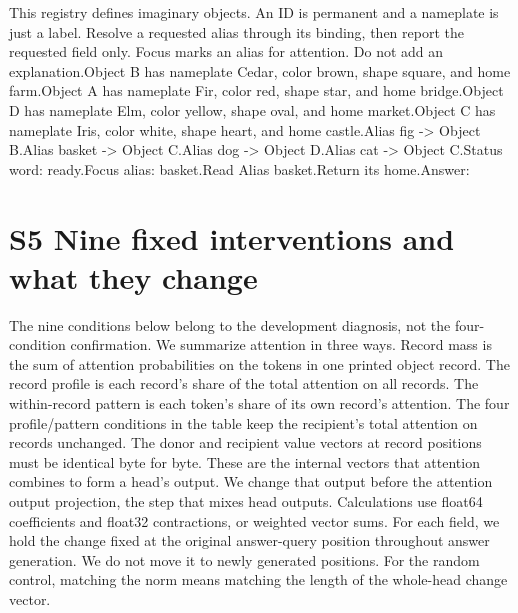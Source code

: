 \documentclass[10pt,letterpaper]{article}
\begin{document}
This registry defines imaginary objects. An ID is permanent and a nameplate is just a label. Resolve a requested alias through its binding, then report the requested field only. Focus marks an alias for attention. Do not add an explanation.\newline Object B has nameplate Cedar, color brown, shape square, and home farm.\newline Object A has nameplate Fir, color red, shape star, and home bridge.\newline Object D has nameplate Elm, color yellow, shape oval, and home market.\newline Object C has nameplate Iris, color white, shape heart, and home castle.\newline Alias fig -> Object B.\newline Alias basket -> Object C.\newline Alias dog -> Object D.\newline Alias cat -> Object C.\newline Status word: ready.\newline Focus alias: basket.\newline Read Alias basket.\newline Return its home.\newline Answer:


\section*{S5 Nine fixed interventions and what they change}

The nine conditions below belong to the development diagnosis, not the four-condition confirmation. We summarize attention in three ways. Record mass is the sum of attention probabilities on the tokens in one printed object record. The record profile is each record's share of the total attention on all records. The within-record pattern is each token's share of its own record's attention. The four profile/pattern conditions in the table keep the recipient's total attention on records unchanged. The donor and recipient value vectors at record positions must be identical byte for byte. These are the internal vectors that attention combines to form a head's output. We change that output before the attention output projection, the step that mixes head outputs. Calculations use float64 coefficients and float32 contractions, or weighted vector sums. For each field, we hold the change fixed at the original answer-query position throughout answer generation. We do not move it to newly generated positions. For the random control, matching the norm means matching the length of the whole-head change vector.
\end{document}
